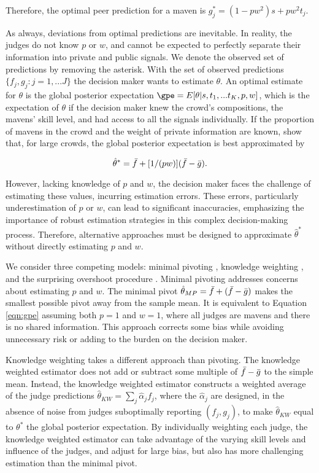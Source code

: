 \noindent Therefore, the optimal peer prediction for a maven is $g_j^* =(1-pw^2)s + pw^2t_j$. 

As always, deviations from optimal predictions are inevitable. In reality, the judges do not know $p$ or $w$, and cannot be expected to perfectly separate their information into private and public signals. We denote the observed set of predictions by removing the asterisk. With the set of observed predictions $\{f_j, g_j: j=1,...J\}$ the decision maker wants to estimate $\theta$. An optimal estimate for $\theta$ is the global posterior expectation $\gpe = E[\theta|s, t_1,...t_{K},p,w]$, which is the expectation of $\theta$ if the decision maker knew the crowd's compositions, the mavens' skill level, and had access to all the signals individually. If the proportion of mavens in the crowd and the weight of private information are known, \cite{mp} show that, for large crowds, the global posterior expectation is best approximated by

\begin{equation}
    \hat{\theta}^* = \Bar{f} + [1/(pw)](\Bar{f} - \Bar{g}). 
    \label{eqn:gpe}
\end{equation}

However, lacking knowledge of $p$ and $w$, the decision maker faces the challenge of estimating these values, incurring estimation errors. These errors, particularly underestimation of $p$ or $w$, can lead to significant inaccuracies, emphasizing the importance of robust estimation strategies in this complex decision-making process. Therefore, alternative approaches must be designed to approximate $\hat{\theta}^*$ without directly estimating $p$ and $w$. 

We consider three competing models: minimal pivoting \citep{mp}, knowledge weighting \citep{kw}, and the surprising overshoot procedure \citep{so}. Minimal pivoting addresses concerns about estimating $p$ and $w$. The minimal pivot $\hat{\theta}_{MP} = \Bar{f} + (\Bar{f} - \Bar{g})$ makes the smallest possible pivot away from the sample mean. It is equivalent to Equation \ref{eqn:gpe} assuming both $p=1$ and $w=1$, where all judges are mavens and there is no shared information. This approach corrects some bias while avoiding unnecessary risk or adding to the burden on the decision maker.

Knowledge weighting takes a different approach than pivoting. The knowledge weighted estimator does not add or subtract some multiple of $\Bar{f}-\Bar{g}$ to the simple mean. Instead, the knowledge weighted estimator constructs a weighted average of the judge predictions $\hat{\theta}_{KW} = \sum_j \hat{\alpha}_jf_j$, where the $\hat{\alpha}_j$ are designed, in the absence of noise from judges suboptimally reporting $(f_j, g_j)$, to make $\hat{\theta}_{KW}$ equal to ${\theta}^*$ the global posterior expectation.  By individually weighting each judge, the knowledge weighted estimator can take advantage of the varying skill levels and influence of the judges, and adjust for large bias, but also has more challenging estimation than the minimal pivot. 

